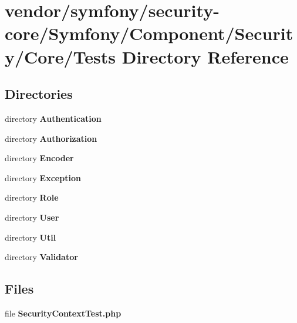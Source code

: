 \section{vendor/symfony/security-\/core/\+Symfony/\+Component/\+Security/\+Core/\+Tests Directory Reference}
\label{dir_22a527bc33fa3d7ad07b220b1c28e1ac}
\subsection*{Directories}
\begin{DoxyCompactItemize}
\item 
directory {\bf Authentication}
\item 
directory {\bf Authorization}
\item 
directory {\bf Encoder}
\item 
directory {\bf Exception}
\item 
directory {\bf Role}
\item 
directory {\bf User}
\item 
directory {\bf Util}
\item 
directory {\bf Validator}
\end{DoxyCompactItemize}
\subsection*{Files}
\begin{DoxyCompactItemize}
\item 
file {\bf Security\+Context\+Test.\+php}
\end{DoxyCompactItemize}
